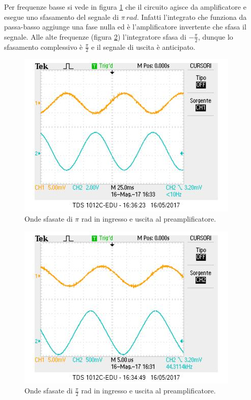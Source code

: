 \documentclass[10pt,a4paper]{article}
\begin{document}
Per frequenze basse si vede in figura \ref{integratoreBasso} che il circuito agisce da amplificatore e esegue uno sfasamento del segnale di $\pi \, rad$. Infatti l'integrato che funziona da passa-basso aggiunge una fase nulla ed è l'amplificatore invertente che sfasa il segnale. Alle alte frequenze (figura \ref{integratoreAlto}) l'integratore sfasa di $-\frac{\pi}{2}$, dunque lo sfasamento complessivo è $\frac{\pi}{2}$ e il segnale di uscita è anticipato.

\begin{figure}[!htb]
\centering
\includegraphics[scale=0.7]{integratoreBassaFrequenza.jpg}
\caption{Onde sfasate di $\pi$ rad in ingresso e uscita al preamplificatore.\label{integratoreBasso}}
\end{figure}

\begin{figure}[!htb]
\centering
\includegraphics[scale=0.7]{integratoreAltaFreq.jpg}
\caption{Onde sfasate di $\frac{\pi}{2}$ rad in ingresso e uscita al preamplificatore.\label{integratoreAlto}}
\end{figure}
\end{document}
